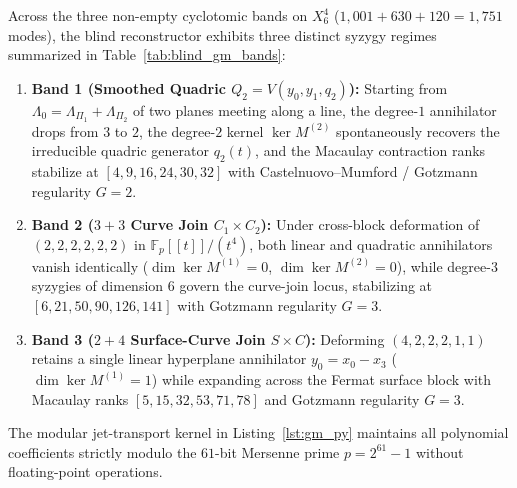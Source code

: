 \documentclass[11pt,a4paper]{article}
\begin{document}
Across the three non-empty cyclotomic bands on $X_6^4$ ($1{,}001 + 630 + 120 = 1{,}751$ modes), the blind reconstructor exhibits three distinct syzygy regimes summarized in Table~\ref{tab:blind_gm_bands}:
\begin{enumerate}
  \item \textbf{Band 1 (Smoothed Quadric $Q_2 = V(y_0, y_1, q_2)$):} Starting from $\Lambda_0 = \Lambda_{\Pi_1} + \Lambda_{\Pi_2}$ of two planes meeting along a line, the degree-$1$ annihilator drops from $3$ to $2$, the degree-$2$ kernel $\ker M^{(2)}$ spontaneously recovers the irreducible quadric generator $q_2(t)$, and the Macaulay contraction ranks stabilize at $[4, 9, 16, 24, 30, 32]$ with Castelnuovo--Mumford / Gotzmann regularity $G = 2$.
  \item \textbf{Band 2 ($3+3$ Curve Join $C_1 \times C_2$):} Under cross-block deformation of $(2,2,2,2,2,2)$ in $\mathbb{F}_p[[t]]/(t^4)$, both linear and quadratic annihilators vanish identically ($\dim \ker M^{(1)} = 0$, $\dim \ker M^{(2)} = 0$), while degree-$3$ syzygies of dimension $6$ govern the curve-join locus, stabilizing at $[6, 21, 50, 90, 126, 141]$ with Gotzmann regularity $G = 3$.
  \item \textbf{Band 3 ($2+4$ Surface-Curve Join $S \times C$):} Deforming $(4,2,2,2,1,1)$ retains a single linear hyperplane annihilator $y_0 = x_0 - x_3$ ($\dim \ker M^{(1)} = 1$) while expanding across the Fermat surface block with Macaulay ranks $[5, 15, 32, 53, 71, 78]$ and Gotzmann regularity $G = 3$.
\end{enumerate}

The modular jet-transport kernel in Listing~\ref{lst:gm_py} maintains all polynomial coefficients strictly modulo the $61$-bit Mersenne prime $p = 2^{61} - 1$ without floating-point operations.
\end{document}
